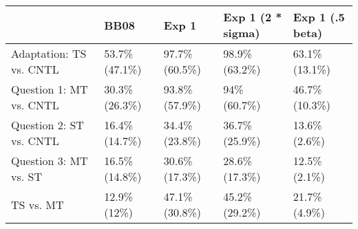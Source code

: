 
\begin{tabular}{l|l|l|l|l}
\hline
  & BB08 & Exp 1 & Exp 1 (2 * sigma) & Exp 1 (.5 beta)\\
\hline
Adaptation: TS vs. CNTL & 53.7\% (47.1\%) & 97.7\% (60.5\%) & 98.9\% (63.2\%) & 63.1\% (13.1\%)\\
\hline
Question 1: MT vs. CNTL & 30.3\% (26.3\%) & 93.8\% (57.9\%) & 94\% (60.7\%) & 46.7\% (10.3\%)\\
\hline
Question 2: ST vs. CNTL & 16.4\% (14.7\%) & 34.4\% (23.8\%) & 36.7\% (25.9\%) & 13.6\% (2.6\%)\\
\hline
Question 3: MT vs. ST & 16.5\% (14.8\%) & 30.6\% (17.3\%) & 28.6\% (17.3\%) & 12.5\% (2.1\%)\\
\hline
TS vs. MT & 12.9\% (12\%) & 47.1\% (30.8\%) & 45.2\% (29.2\%) & 21.7\% (4.9\%)\\
\hline
\end{tabular}
